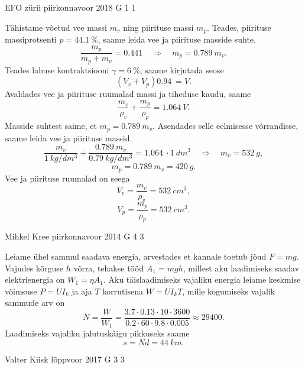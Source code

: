 \documentclass[11pt, twoside]{article}
\begin{document}
{%
{EFO zürii} %
{piirkonnavoor} %
{2018} %
{G 1} %
{1} %
{

\ifSolution
Tähistame võetud vee massi $m_v$ ning piirituse massi $m_p$. Teades, piirituse massiprotsenti $p = \SI{44,1}{\percent}$, saame leida vee ja piirituse masside suhte.
\[ \frac{m_p}{m_p+m_v}=\SI{0,441}  \quad\Rightarrow\quad m_p=\SI{0,789}{}m_v.\]
Teades lahuse kontraktsiooni $\gamma = \SI{6}{\percent}$, saame kirjutada seose
\[ (V_v + V_p)\SI{0,94}{} = V.\]
Avaldades vee ja piirituse ruumalad massi ja tiheduse kaudu, saame
\[ \frac{m_v}{\rho_v} + \frac{m_p}{\rho_p} = \SI{1,064}{}V.\]
Masside suhtest saime, et $m_p=\SI{0,789}{}m_v$. Asendades selle eelmisesse võrrandisse, saame leida vee ja piirituse massid.
\[ \frac{m_v}{\SI{1}{kg/dm^3}} + \frac{\SI{0,789}{}{m_v}}{\SI{0,79}{kg/dm^3}} = \SI{1,064}{}\cdot\SI{1}{dm^3} \quad\Rightarrow\quad
m_v = \SI{532}{g},\]
\[ m_p = \SI{0,789}{}m_v =  \SI{420}{g}.\]
Vee ja piirituse ruumalad on seega
\[ V_v = \frac{m_v}{\rho_v} = \SI{532}{cm^3},\]
\[ V_p = \frac{m_p}{\rho_p} =  \SI{532}{cm^3}.\]
\fi
}

{Mihkel Kree} %
{piirkonnavoor} %
{2014} %
{G 4} %
{3} %
{

\ifSolution
Leiame ühel sammul saadava energia, arvestades et kannale toetub jõud $F=mg$. Vajudes kõrguse $h$ võrra, tehakse tööd $A_1 = mgh$, millest aku laadimiseks saadav elektrienergia on $W_1=\eta A_1$. 
Aku täislaadimiseks vajaliku energia leiame keskmise võimsuse $P=UI_k$ ja aja $T$ korrutisena $W=UI_kT$, mille kogumiseks vajalik sammude arv on
\[N = \frac{W}{W_1} = \frac{3.7 \cdot 0.13 \cdot 10 \cdot 3600 }{0.2 \cdot 60\cdot 9.8 \cdot 0.005}\approx29400.\]
Laadimiseks vajaliku jalutuskäigu pikkuseks saame
\[s=Nd = \SI{44}{km}.\]
\fi
}

{Valter Kiisk} %
{lõppvoor} %
{2017} %
{G 3} %
{3} %
{

}}
\end{document}
